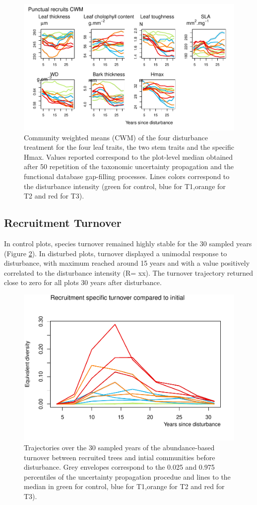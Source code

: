 \documentclass[fleqn,10pt]{ArtEcoFoG} %
\begin{document}
\begin{figure}

{\centering \includegraphics[width=0.8\linewidth]{RecruitmentTrajectories_files/figure-latex/Fig3-1} 

}

\caption{Community weighted means (CWM) of the four disturbance treatment for the four leaf traits, the two stem traits  and the specific Hmax. Values reported correspond to the plot-level median obtained after 50 repetition of the taxonomic uncertainty propagation and the functional database gap-filling processes. Lines colors correspond to the disturbance intensity (green for control, blue for T1,orange for T2 and red for T3).}\label{fig:Fig3}
\end{figure}

\subsection{Recruitment Turnover}\label{recruitment-turnover}

In control plots, species turnover remained highly stable for the 30
sampled years (Figure \ref{fig:Fig4}). In disturbed plots, turnover
displayed a unimodal response to disturbance, with maximum reached
around 15 years and with a value positively correlated to the
disturbance intensity (R= xx). The turnover trajectory returned close to
zero for all plots 30 years after disturbance.

\begin{figure}

{\centering \includegraphics[width=0.5\linewidth]{RecruitmentTrajectories_files/figure-latex/Fig4-1} 

}

\caption{Trajectories over the 30 sampled years of the abundance-based turnover between recruited trees and intial communities before disturbance. Grey envelopes correspond to the 0.025 and 0.975 percentiles of the uncertainty propagation procedue and lines to the median in green for control, blue for T1,orange for T2 and red for T3).}\label{fig:Fig4}
\end{figure}
\end{document}
